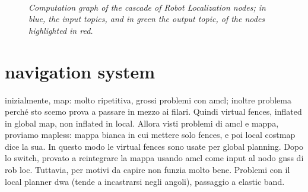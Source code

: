 \begin{figure}
	\centering
	 \\
	\caption{\textit{Computation graph of the cascade of Robot Localization nodes; in blue, the input topics, and in green the output topic, of the nodes highlighted in red.}}
	\label{fig:cascadeRobotLocalization}
\end{figure}


\section{navigation system}\label{sec:navigationSystem}
inizialmente, map: molto ripetitiva, grossi problemi con amcl;  inoltre problema perché sto scemo prova a passare in mezzo ai filari. Quindi virtual fences, inflated in global map, non inflated in local. Allora visti problemi di amcl e mappa, proviamo mapless: mappa bianca in cui mettere solo fences, e poi local costmap dice la sua. In questo modo le virtual fences sono usate per global planning. 
Dopo lo switch, provato a reintegrare la mappa usando amcl come input al nodo gnss di rob loc. Tuttavia, per motivi da capire non funzia molto bene. Problemi con il local planner dwa (tende a incastrarsi negli angoli), passaggio a elastic band.




